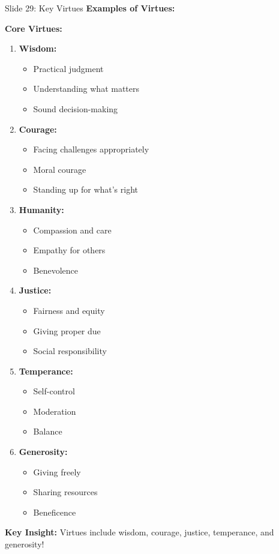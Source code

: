\documentclass[8pt]{beamer}
\begin{document}
	\begin{frame}{Slide 29: Key Virtues}
		\fontsize{6.5}{7.5}\selectfont
		\textbf{Examples of Virtues:}
		
		\vspace{0.1cm}
		\textbf{Core Virtues:}
		\begin{enumerate}
			\item \textbf{Wisdom:}
			\begin{itemize}
				\item Practical judgment
				\item Understanding what matters
				\item Sound decision-making
			\end{itemize}
			\item \textbf{Courage:}
			\begin{itemize}
				\item Facing challenges appropriately
				\item Moral courage
				\item Standing up for what's right
			\end{itemize}
			\item \textbf{Humanity:}
			\begin{itemize}
				\item Compassion and care
				\item Empathy for others
				\item Benevolence
			\end{itemize}
			\item \textbf{Justice:}
			\begin{itemize}
				\item Fairness and equity
				\item Giving proper due
				\item Social responsibility
			\end{itemize}
			\item \textbf{Temperance:}
			\begin{itemize}
				\item Self-control
				\item Moderation
				\item Balance
			\end{itemize}
			\item \textbf{Generosity:}
			\begin{itemize}
				\item Giving freely
				\item Sharing resources
				\item Beneficence
			\end{itemize}
		\end{enumerate}
		
		\textcolor{myblue}{\textbf{Key Insight:}} Virtues include \textcolor{myblue}{wisdom, courage, justice, temperance, and generosity}!
	\end{frame}
	
\end{document}
